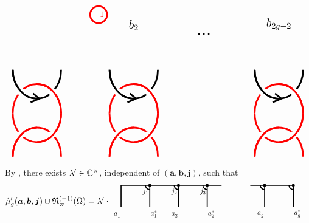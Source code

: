 \documentclass[11pt]{article}
\begin{document}
\begin{example}
\[{{{\begin{tikzpicture}[line width=2pt]
\begin{scope}[shift={(-1,-1)}]
\begin{scope}[red, shift={(3.55,2.8)}]
\draw[fill=white] (0,0) circle (10pt);
\node at (0,0) {$-1$};
\end{scope}
\node[above] at (5,2) {\Large $b_2$};
\node[above] at (11,2) {\Large $b_{2g-2}$};	
\end{scope}
\foreach\x in {0,4,10}
{\begin{scope}[shift={(1+\x,-2.28)}, xscale=2, yscale=1.2]
\draw[red] (0,0) arc (0:180:0.5 and 1);  
\draw (0,1.5) arc (360:180:0.5 and 1);
\fill[white] (-0.18,0.73) circle (3pt);  
\fill[white] (-0.82,0.73) circle (3pt);  
\draw[red] (0,0) arc (0:90:0.5 and 1);  
\draw (-0.5,0.5) arc (270:180:0.5 and 1);
\draw(-0.45,0.5)--++(-0.13,0.18);\draw(-0.45,0.5)--++(-0.18,-0.13);
\end{scope}
\begin{scope}[shift={(1+\x,-2.28)}, yscale=-1.2, xscale=2
]
\draw[red] (0,0) arc (0:180:0.5 and 1);  
\draw[red] (0,1.5) arc (360:180:0.5 and 1);
\fill[white] (-0.18,0.73) circle (3pt);  
\fill[white] (-0.82,0.73) circle (3pt);  
\draw[red] (0,0) arc (0:90:0.5 and 1);  
\draw[red] (-0.5,0.5) arc (270:180:0.5 and 1);
\end{scope}}
\foreach\x in {1,2,3}{\fill[black] (6.5+0.2*\x,1) circle (1pt);}
\end{tikzpicture}}}}\]
By \cite[Eq.\ (3.1.6)]{BK01}, there exists ${\lambda}' \in {\mathbb{C}}^\times$,  independent of $(\bm{a}, \bm{b}, \bm{j})$, such that 
\[\begin{split}
&\hmu'_{g}(\bm{a}, \bm{b}, \bm{j})\cup \fN_{\varpi}^{(-1)}(\Omega)= 
\ld' \cdot 
\vcenter{\hbox{\scalebox{0.6}{
\begin{tikzpicture}[line width=2pt]
\begin{scope}[shift={(-1,-1)}]
\draw (0,2)--(7,2); \draw(9,2)--(12,2);
\node[left] at (0.1,0) {\Large $a_1^{\phantom{*}}$};
\node[right] at (1.9,0) {\Large $a_1^{*}$};
\node[left] at (4.1,0) {\Large $a_2^{\phantom{*}}$};
\node[right] at (5.9,0) {\Large $a_2^{{*}}$};
\node[left] at (10.1,0) {\Large $a_g^{\phantom{*}}$};
\node[right] at (11.9,0) {\Large $a_g^{{*}}$};
\foreach \x in {0,1,2,3,5,6}{\draw (2*\x, 2)--(2*\x,0.5);}
\foreach\x in {1,2,3,5,6}
{\begin{scope}[shift={(2*\x, 2)}]
\draw ([shift=(180:0.3cm)]0,0) arc (180:270:0.3cm);
\fill[black] (0,0) circle (3pt);
\end{scope}}
\foreach\x in {1,2,3}{\node[left] at (2*\x+0.05,1.55) {\Large $j_{\x}$};}

\end{scope}
\end{tikzpicture}}}}
\end{split}\]
\end{example}
\end{document}
